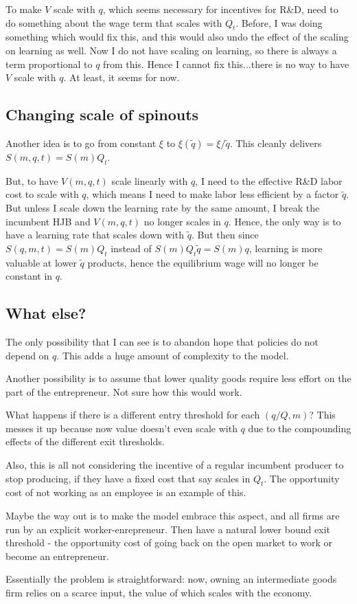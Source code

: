 \documentclass[11pt,english]{article}
\theoremstyle{remark}
\begin{document}
To make $V$ scale with $q$, which seems necessary for incentives for R\&D, need to do something about the wage term that scales with $Q_t$. Before, I was doing something which would fix this, and this would also undo the effect of the scaling on learning as well. Now I do not have scaling on learning, so there is always a term proportional to $q$ from this. Hence I cannot fix this...there is no way to have $V$ scale with $q$. At least, it seems for now. 

\subsection{Changing scale of spinouts}

Another idea is to go from constant $\xi$ to $\xi(\tilde{q}) = \xi / \tilde{q}$. This cleanly delivers $S(m,q,t) = S(m) Q_t$.

But, to have $V(m,q,t)$ scale linearly with $q$, I need to the effective R\&D labor cost to scale with $q$, which means I need to make labor less efficient by a factor $\tilde{q}$. But unless I scale down the learning rate by the same amount, I break the incumbent HJB and $V(m,q,t)$ no longer scales in $q$. Hence, the only way is to have a learning rate that scales down with $\tilde{q}$. But then since $S(q,m,t) = S(m) Q_t$ instead of $S(m) Q_t \tilde{q} = S(m) q$, learning is more valuable at lower $\tilde{q}$ products, hence the equilibrium wage will no longer be constant in $q$.

\subsection{What else?}

The only possibility that I can see is to abandon hope that policies do not depend on $q$. This adds a huge amount of complexity to the model. 

Another possibility is to assume that lower quality goods require less effort on the part of the entrepreneur. Not sure how this would work.

What happens if there is a different entry threshold for each $(q/Q,m)$? This messes it up because now value doesn't even scale with $q$ due to the compounding effects of the different exit thresholds. 

Also, this is all not considering the incentive of a regular incumbent producer to stop producing, if they have a fixed cost that say scales in $Q_t$. The opportunity cost of not working as an employee is an example of this. 

Maybe the way out is to make the model embrace this aspect, and all firms are run by an explicit worker-enrepreneur. Then have a natural lower bound exit threshold - the opportunity cost of going back on the open market to work or become an entrepreneur.

Essentially the problem is straightforward: now, owning an intermediate goods firm relies on a scarce input, the value of which scales with the economy. 










 
\end{document}
